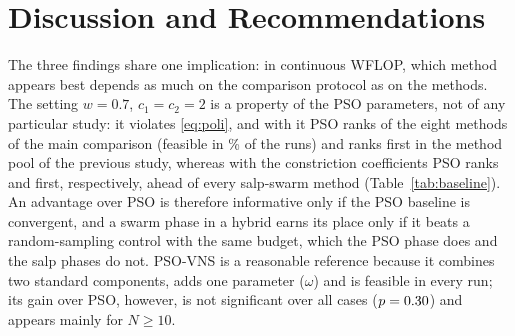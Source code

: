 \section{Discussion and Recommendations}
\label{sec:discussion}
The three findings share one implication: in continuous WFLOP, which method appears best depends as much on the comparison protocol as on the methods. The setting $w=0.7$, $c_1=c_2=2$ is a property of the PSO parameters, not of any particular study: it violates \eqref{eq:poli}, and with it PSO ranks \NOldPSOPos{} of the eight methods of the main comparison (feasible in \NOldPSOFeas\% of the runs) and \NBaseOldBest{} ranks first in the method pool of the previous study, whereas with the constriction coefficients PSO ranks \NPSOPos{} and \NBaseNewBest{} first, respectively, ahead of every salp-swarm method (Table~\ref{tab:baseline}).
An advantage over PSO is therefore informative only if the PSO baseline is convergent, and a swarm phase in a hybrid earns its place only if it beats a random-sampling control with the same budget, which the PSO phase does and the salp phases do not. PSO-VNS is a reasonable reference because it combines two standard components, adds one parameter ($\omega$) and is feasible in every run; its gain over PSO, however, is not significant over all cases ($p=0.30$) and appears mainly for $N\ge10$.


